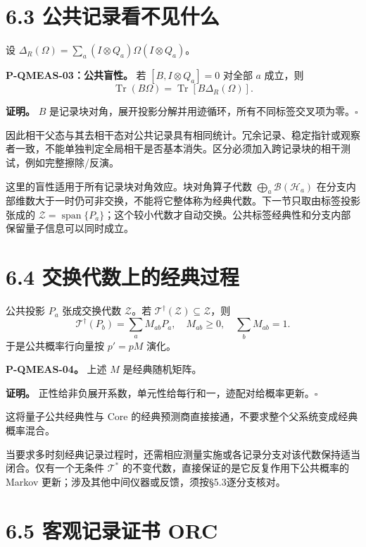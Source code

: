 \documentclass[
  11pt,
  oneside]{book}
\begin{document}
\section{6.3 公共记录看不见什么}

设 \(\Delta_R(\Omega)=\sum_a(I\otimes Q_a)\Omega(I\otimes Q_a)\)。

\protect\hypertarget{p-qmeas-03}{}{}

\textbf{P-QMEAS-03：公共盲性。} 若 \([B,I\otimes Q_a]=0\) 对全部 \(a\)
成立，则 \[
\operatorname{Tr}(B\Omega)=\operatorname{Tr}[B\Delta_R(\Omega)].
\]

\textbf{证明。} \(B\)
是记录块对角，展开投影分解并用迹循环，所有不同标签交叉项为零。\(\square\)

因此相干父态与其去相干态对公共记录具有相同统计。冗余记录、稳定指针或观察者一致，不能单独判定全局相干是否基本消失。区分必须加入跨记录块的相干测试，例如完整擦除/反演。

这里的盲性适用于所有记录块对角效应。块对角算子代数
\(\bigoplus_a\mathcal B(\mathcal H_a)\)
在分支内部维数大于一时仍可非交换，不能将它整体称为经典代数。下一节只取由标签投影张成的
\(\mathcal Z=\operatorname{span}\{P_a\}\)；这个较小代数才自动交换。公共标签经典性和分支内部保留量子信息可以同时成立。

\section{6.4 交换代数上的经典过程}

公共投影 \(P_a\) 张成交换代数 \(\mathcal Z\)。若
\(\mathcal T^\dagger(\mathcal Z)\subseteq\mathcal Z\)，则 \[
\mathcal T^\dagger(P_b)=\sum_a M_{ab}P_a,\quad
M_{ab}\ge0,\quad\sum_bM_{ab}=1.
\] 于是公共概率行向量按 \(p'=pM\) 演化。

\protect\hypertarget{p-qmeas-04}{}{}

\textbf{P-QMEAS-04。} 上述 \(M\) 是经典随机矩阵。

\textbf{证明。}
正性给非负展开系数，单元性给每行和一，迹配对给概率更新。\(\square\)

这将量子公共经典性与 Core
的经典预测商直接接通，不要求整个父系统变成经典概率混合。

当要求多时刻经典记录过程时，还需相应测量实施或各记录分支对该代数保持适当闭合。仅有一个无条件
\(\mathcal T^*\) 的不变代数，直接保证的是它反复作用下公共概率的 Markov
更新；涉及其他中间仪器或反馈，须按§5.3逐分支核对。

\section{6.5 客观记录证书 ORC}
\end{document}

